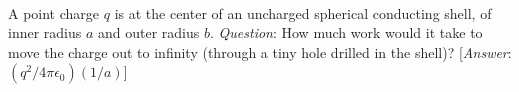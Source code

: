 \documentclass[11pt]{../hmcpsetrhino}
\begin{document}
\pagebreak


\begin{problem}[2.60] \\
	A point charge $q$ is at the center of an uncharged spherical conducting shell, of inner radius $a$ and outer radius $b$. \emph{Question}: How much work would it take to move the charge out to infinity (through a  tiny hole drilled in the shell)? [\emph{Answer}: $(q^2/4 \pi \epsilon_0)(1/a)$]
\end{problem}

\begin{solution}
\vfill
\end{solution}

\pagebreak

\end{document}
